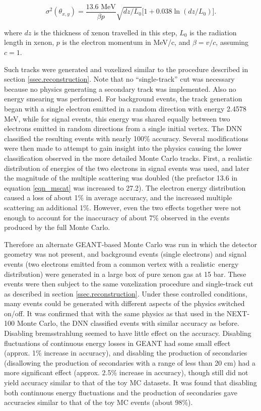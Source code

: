 \documentclass[a4paper,11pt]{article}
\begin{document}
\begin{equation}\label{eqn_mscat}
\sigma^{2}(\theta_{x,y}) = \frac{13.6\,\,\mathrm{MeV}}{\beta p}\sqrt{dz/L_{0}}\bigl[1 + 0.038\ln(dz/L_{0})\bigr].
\end{equation}

\noindent where $dz$ is the thickness of xenon travelled in this step, $L_{0}$ is the radiation length in xenon, $p$ is the electron momentum in MeV/c, and $\beta = v/c$, assuming $c = 1$.

Such tracks were generated and voxelized similar to the procedure described in section \ref{ssec.reconstruction}.  Note that no ``single-track'' cut was necessary because no
physics generating a secondary track was implemented.  Also no energy smearing was performed.  For background events, the track generation began with a single electron emitted in a
random direction with energy 2.4578 MeV, while for signal events, this energy was shared equally between two electrons emitted in random directions from a single initial vertex.  The DNN
classified the resulting events with nearly 100\% accuracy.  Several modifications were then made to attempt to gain insight into the physics causing the lower classification observed in the
more detailed Monte Carlo tracks.  First, a realistic distribution of energies of the two electrons in signal events \cite{Ponkratenko_2000} was used, and later the magnitude of the multiple scattering was doubled (the prefactor 13.6 in equation \ref{eqn_mscat} was increased to 27.2).  The electron energy distribution caused a loss of about 1\% in average accuracy, and the
increased multiple scattering an additional 1\%.  However, even the two effects together were not enough to account for the inaccuracy of about 7\% observed in the events produced by the
full Monte Carlo.

Therefore an alternate GEANT-based Monte Carlo was run in which the detector geometry was not present, and background events (single electrons) and signal events (two electrons emitted
from a common vertex with a realistic \bbonu\,energy distribution) were generated in a large box of pure xenon gas at 15 bar.  These events were then subject to the same voxelization 
procedure and single-track cut as described in section \ref{ssec.reconstruction}.  Under these controlled conditions, many 
events could be generated with different aspects of the physics switched on/off.  It was confirmed that with the same physics as that used in the NEXT-100 Monte Carlo, the DNN classified events 
with similar accuracy as before.  Disabling bremsstrahlung seemed to have little effect on the accuracy.  Disabling fluctuations of continuous energy losses in GEANT had some small 
effect (approx. 1\% increase in accuracy), and disabling the production of secondaries (disallowing the production of secondaries with a range of less than 20 cm) had a more 
significant effect (approx. 2.5\% increase in accuracy), though still did not yield accuracy similar to that of the toy MC datasets.  It was found that disabling both continuous energy fluctuations 
and the production of secondaries gave accuracies similar to that of the toy MC events (about 98\%).
\end{document}
